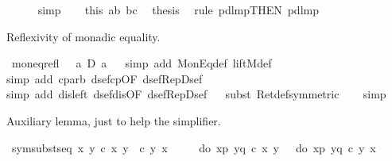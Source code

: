 \begin{isabellebody}
\ \ \ \ \isamarkupfalse%
\ simp\isanewline
\ \ \isamarkupfalse%
\ this\ ab\ bc\ \isamarkupfalse%
\ {\isacharquery}thesis\ \isamarkupfalse%
\ {\isacharparenleft}rule\ pdl{\isacharunderscore}mp{\isacharbrackleft}THEN\ pdl{\isacharunderscore}mp{\isacharbrackright}{\isacharparenright}\isanewline
\isamarkupfalse%
\isamarkupfalse%
%
\begin{isamarkuptext}%
Reflexivity of monadic equality.%
\end{isamarkuptext}%
\isamarkuptrue%
\ mon{\isacharunderscore}eq{\isacharunderscore}refl{\isacharcolon}\ \ {\isachardoublequote}{\isasymturnstile}\ a\ {\isacharequal}\isactrlsub D\ a{\isachardoublequote}\isanewline
\ \ \isamarkupfalse%
simp\ add{\isacharcolon}\ MonEq{\isacharunderscore}def\ liftM{}{\isacharunderscore}def{\isacharparenright}\isanewline
\ \ \isamarkupfalse%
simp\ add{\isacharcolon}\ cp{\isacharunderscore}arb\ dsef{\isacharunderscore}cp{\isacharbrackleft}OF\ dsef{\isacharunderscore}Rep{\isacharunderscore}Dsef{\isacharbrackright}{\isacharparenright}\isanewline
\ \ \isamarkupfalse%
simp\ add{\isacharcolon}\ dis{\isacharunderscore}left{}\ dsef{\isacharunderscore}dis{\isacharbrackleft}OF\ dsef{\isacharunderscore}Rep{\isacharunderscore}Dsef{\isacharbrackright}{\isacharparenright}\isanewline
\ \ \isamarkupfalse%
subst\ Ret{\isacharunderscore}def{\isacharbrackleft}symmetric{\isacharbrackright}{\isacharparenright}\isanewline
\ \ \isamarkupfalse%
\ {\isacharparenleft}simp{\isacharparenright}\isamarkupfalse%
%
\begin{isamarkuptext}%
Auxiliary lemma, just to help the simplifier.%
\end{isamarkuptext}%
\isamarkuptrue%
\ sym{\isacharunderscore}subst{\isacharunderscore}seq{}{\isacharcolon}\ {\isachardoublequote}{\isasymforall}x\ y{\isachardot}\ c\ x\ y\ {\isacharequal}\ c\ y\ x\ {\isasymLongrightarrow}\ \isanewline
\ \ {\isacharparenleft}{\isasymUp}\ {\isacharparenleft}do\ {\isacharbraceleft}x{\isasymleftarrow}p{\isacharsemicolon}\ y{\isasymleftarrow}q{\isacharsemicolon}\ c\ x\ y{\isacharbraceright}{\isacharparenright}{\isacharparenright}\ {\isacharequal}\ {\isacharparenleft}{\isasymUp}\ {\isacharparenleft}do\ {\isacharbraceleft}x{\isasymleftarrow}p{\isacharsemicolon}\ y{\isasymleftarrow}q{\isacharsemicolon}\ c\ y\ x{\isacharbraceright}{\isacharparenright}{\isacharparenright}{\isachardoublequote}\isanewline

\end{isabellebody}
